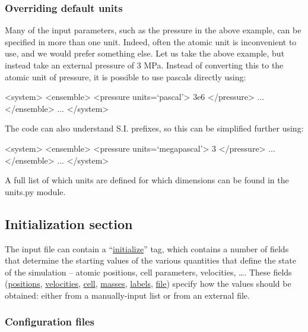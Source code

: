 \documentclass[11pt,english,fleqn]{report}
\newenvironment{code}{%
\footnotesize
\verbatim
}{
\endverbatim
\normalsize
}
\begin{document}
\subsubsection{Overriding default units}

\label{inputunits}

Many of the input parameters, such as the pressure in the above example,
can be specified in more than one unit. Indeed, often the atomic unit
is inconvenient to use, and we would prefer something else. Let us
take the above example, but instead take an external pressure of 3
MPa. Instead of converting this to the atomic unit of pressure, it
is possible to use pascals directly using:

\begin{code}
<system>
   <ensemble>
      <pressure units=`pascal'> 3e6 </pressure>
      ...
   </ensemble>
   ...
</system>
\end{code}

The code can also understand S.I. prefixes, so this can be simplified
further using:

\begin{code}
<system>
   <ensemble>
      <pressure units=`megapascal'> 3 </pressure>
      ...
   </ensemble>
   ...
</system>
\end{code}

A full list of which units are defined for which dimensions
can be found in the units.py module.


\subsection{Initialization section}

The input file can contain a {}``\hyperref[INITIALIZER]{initialize}'' tag, which
contains a number of fields that determine the starting values of the various
quantities that define the state of the simulation -- atomic positions, cell parameters, velocities, \ldots.
These fields (\hyperref[INITPOSITIONS]{positions},  \hyperref[INITVELOCITIES]{velocities},
\hyperref[INITCELL]{cell},  \hyperref[INITMASSES]{masses},  \hyperref[INITLABELS]{labels},
\hyperref[INITFILE]{file}) specify how the values should be obtained:
either from a manually-input list or from an external file.

\subsubsection{Configuration files}
\end{document}
